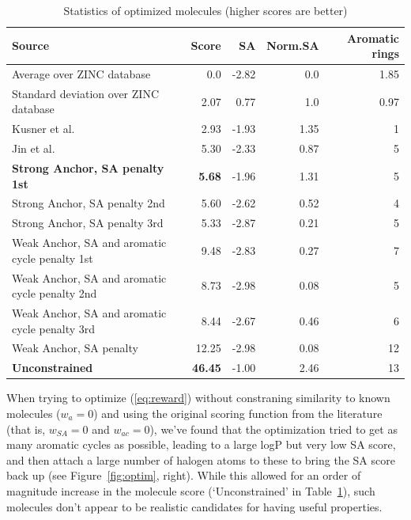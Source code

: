 \documentclass{article}
\begin{document}
\begin{table}[ht]
	\begin{center}
		
		\begin{tabular}{|l|r|r|r|r|} 
			\hline
			Source & Score & SA & Norm.SA & Aromatic rings\\
			\hline
			Average over ZINC database&0.0&-2.82& 0.0 &1.85\\
			Standard deviation over ZINC database&2.07&0.77&1.0&0.97\\\hline
			Kusner et al. & 2.93 & -1.93 & 1.35 & 1 \\
			Jin et al. & 5.30 & -2.33 & 0.87 & 5 \\\hline
			{\bf Strong Anchor, SA penalty 1st} &{\bf 5.68} & -1.96 & 1.31 & 5 \\
			Strong Anchor, SA penalty 2nd & 5.60 & -2.62 & 0.52 & 4 \\
			Strong Anchor, SA penalty 3rd & 5.33 & -2.87 & 0.21 & 5 \\\hline
			Weak Anchor, SA and aromatic cycle penalty 1st & 9.48 & -2.83 & 0.27 & 7 \\
			Weak Anchor, SA and aromatic cycle penalty 2nd & 8.73 & -2.98 & 0.08 & 5 \\
			Weak Anchor, SA and aromatic cycle penalty 3rd & 8.44 & -2.67 & 0.46 & 6 \\\hline
			Weak Anchor, SA penalty & 12.25 & -2.98 & 0.08 & 12 \\
			{\bf Unconstrained}& {\bf 46.45} & -1.00 & 2.46 & 13 \\
			\hline
		\end{tabular}
		\caption{Statistics of optimized molecules (higher scores are better)}\label{tab:table1}
	\end{center}
\end{table}
When trying to optimize  (\ref{eq:reward}) without constraning similarity to known molecules ($w_{a} =0$) and using the original scoring function from the literature (that is, $w_{SA}=0$ and  $w_{ac}=0$), we've found that the optimization tried to get as many aromatic cycles as possible, leading to a large logP but very low SA score, and then attach a large number of halogen atoms to these to bring the SA score back up (see Figure~\ref{fig:optim}, right). While this allowed for an order of magnitude increase in the molecule score (`Unconstrained' in Table~\ref{tab:table1}), such molecules don't appear to be realistic candidates for having useful properties. 
\end{document}
